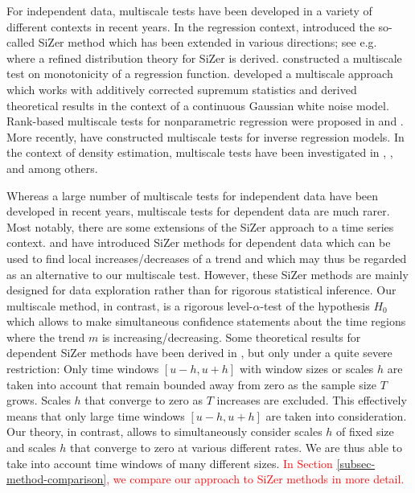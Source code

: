 For independent data, multiscale tests have been developed in a variety of different contexts in recent years. In the regression context, \cite{ChaudhuriMarron1999,ChaudhuriMarron2000} introduced the so-called SiZer method which has been extended in various directions; see e.g.\ \cite{HannigMarron2006} where a refined distribution theory for SiZer is derived. \cite{HallHeckman2000} constructed a multiscale test on monotonicity of a regression function. \cite{DuembgenSpokoiny2001} developed a multiscale approach which works with additively corrected supremum statistics and derived theoretical results in the context of a continuous Gaussian white noise model. Rank-based multiscale tests for nonparametric regression were proposed in \cite{Duembgen2002} and \cite{Rohde2008}. More recently, \cite{ProkschWernerMunk2018} have constructed multiscale tests for inverse regression models. In the context of density estimation, multiscale tests have been investigated in \cite{DuembgenWalther2008}, \cite{RufibachWalther2010}, \cite{SchmidtHieber2013} and \cite{EckleBissantzDette2017} among others. 


Whereas a large number of multiscale tests for independent data have been developed in recent years, multiscale tests for dependent data are much rarer. Most notably, there are some extensions of the SiZer approach to a time series context. \cite{Rondonotti2004} and \cite{Rondonotti2007} have introduced SiZer methods for dependent data which can be used to find local increases/decreases of a trend and which may thus be regarded as an alternative to our multiscale test. However, these SiZer methods are mainly designed for data exploration rather than for rigorous statistical inference. Our multiscale method, in contrast, is a rigorous level-$\alpha$-test of the hypo\-thesis $H_0$ which allows to make simultaneous confidence statements about the time regions where the trend $m$ is increasing/decreasing. Some theoretical results for dependent SiZer methods have been derived in \cite{ParkHannigKang2009}, but only under a quite severe restriction: Only time windows $[u-h,u+h]$ with window sizes or scales $h$ are taken into account that remain bounded away from zero as the sample size $T$ grows. Scales $h$ that converge to zero as $T$ increases are excluded. This effectively means that only large time windows $[u-h,u+h]$ are taken into consideration. Our theory, in contrast, allows to simultaneously consider scales $h$ of fixed size and scales $h$ that converge to zero at various different rates. We are thus able to take into account time windows of many different sizes. \textcolor{red}{In Section \ref{subsec-method-comparison}, we compare our approach to SiZer methods in more detail.}


